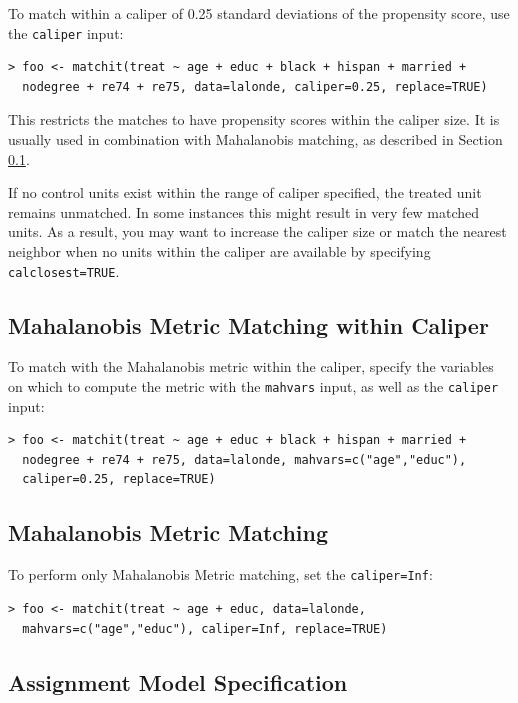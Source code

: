 \documentclass[oneside,letterpaper,titlepage]{article}
\begin{document}
To match within a caliper of 0.25 standard deviations of the
propensity score, use the \texttt{caliper} input:

\begin{verbatim}
> foo <- matchit(treat ~ age + educ + black + hispan + married +
  nodegree + re74 + re75, data=lalonde, caliper=0.25, replace=TRUE)
\end{verbatim}

This restricts the matches to have propensity scores within the
caliper size.  It is usually used in combination with Mahalanobis
matching, as described in Section \ref{mahal}.

If no control units exist within the range of caliper specified, the
treated unit remains unmatched.  In some instances this might result
in very few matched units.  As a result, you may want to increase the
caliper size or match the nearest neighbor when no units within the
caliper are available by specifying \texttt{calclosest=TRUE}.

\subsection{Mahalanobis Metric Matching within Caliper}
\label{mahal}
To match with the Mahalanobis metric within the caliper, specify the
variables on which to compute the metric with the \texttt{mahvars}
input, as well as the \texttt{caliper} input:

\begin{verbatim}
> foo <- matchit(treat ~ age + educ + black + hispan + married +
  nodegree + re74 + re75, data=lalonde, mahvars=c("age","educ"),
  caliper=0.25, replace=TRUE)
\end{verbatim}

\subsection{Mahalanobis Metric Matching}

To perform only Mahalanobis Metric matching, set the
\texttt{caliper=Inf}:

\begin{verbatim}
> foo <- matchit(treat ~ age + educ, data=lalonde,
  mahvars=c("age","educ"), caliper=Inf, replace=TRUE)
\end{verbatim}

\subsection{Assignment Model Specification}
\end{document}
